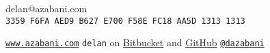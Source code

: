 \documentclass[a4paper,12pt]{article}
\begin{document}
\hrulefill

\hspace{5mm}\begin{minipage}{110mm}
	                    {\Huge{delan\textcolor{lg}{@}azabani\textcolor{lg}{.com}}}
	\vspace{0.5em}  \\  {\texttt{\textcolor{lg}{3359 F6FA AED9 B627 E700 F58E FC18 AA5D 1313 1313}}}
\end{minipage}\hfill\begin{minipage}{50mm}
\end{minipage}\hspace{5mm}

\hrulefill

\vspace{-1ex}\hspace{5mm}\begin{minipage}{160mm}%
	\texttt{\href{https://www.azabani.com/}{www.azabani.com}}
	\hfill
	\texttt{delan} on
	\href{https://bitbucket.org/delan/}{Bitbucket} and
	\href{https://github.com/delan}{GitHub}
	\hfill
	\texttt{\href{https://twitter.com/dazabani}{@dazabani}}
\end{minipage}\hspace{5mm}\vspace{-2ex}

\hrulefill

\vspace{1em}
\end{document}
